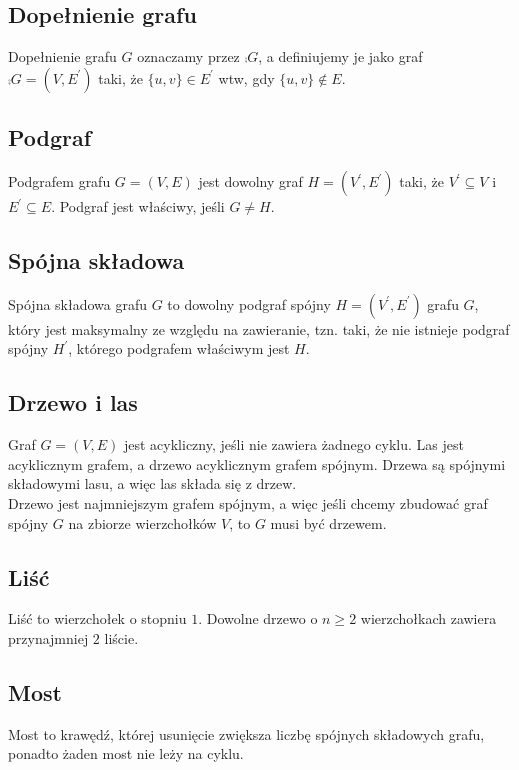\subsection*{Dopełnienie grafu}
Dopełnienie grafu $G$ oznaczamy przez $\comp{G}$, a definiujemy je jako graf
$\comp{G} = (V, E^\prime)$ taki, że $\{ u,v \} \in E^\prime$ wtw, gdy
$\{ u,v \} \notin E$.

\subsection*{Podgraf}
Podgrafem grafu $G = (V, E)$ jest dowolny graf $H = (V^\prime, E^\prime)$ taki,
że $V^\prime \subseteq V$ i $E^\prime \subseteq E$. Podgraf jest właściwy, jeśli
$G \neq H$.

\subsection*{Spójna składowa}
Spójna składowa grafu $G$ to dowolny podgraf spójny $H = (V^\prime, E^\prime)$
grafu $G$, który jest maksymalny ze względu na zawieranie, tzn. taki, że nie
istnieje podgraf spójny $H^\prime$, którego podgrafem właściwym jest $H$.

\subsection*{Drzewo i las}
Graf $G = (V, E)$ jest acykliczny, jeśli nie zawiera żadnego cyklu. Las jest
acyklicznym grafem, a drzewo acyklicznym grafem spójnym. Drzewa są spójnymi
składowymi lasu, a więc las składa się z drzew. \\
Drzewo jest najmniejszym grafem spójnym, a więc jeśli chcemy zbudować graf
spójny $G$ na zbiorze wierzchołków $V$, to $G$ musi być drzewem.

\subsection*{Liść}
Liść to wierzchołek o stopniu $1$. Dowolne drzewo o $n \geq 2$ wierzchołkach 
zawiera przynajmniej $2$ liście.

\subsection*{Most}
Most to krawędź, której usunięcie zwiększa liczbę spójnych składowych grafu,
ponadto żaden most nie leży na cyklu.

